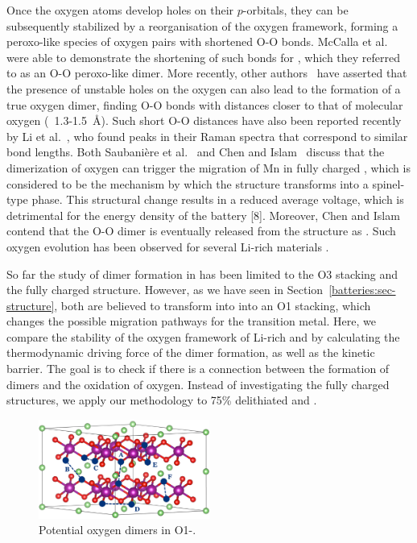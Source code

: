 \begin{refsection}
Once the oxygen atoms develop holes on their $p$-orbitals, they can be subsequently stabilized by a reorganisation of the oxygen framework, forming a peroxo-like species of oxygen pairs with shortened O-O bonds. McCalla et al.~\cite{McCalla2015} were able to demonstrate the shortening of such bonds for , which they referred to as an O-O peroxo-like dimer. More recently, other authors~\cite{Saubanere2016, Chen2016} have asserted that the presence of unstable holes on the oxygen can also lead to the formation of a true oxygen dimer, finding O-O bonds with distances closer to that of molecular oxygen (~1.3-1.5~\si{\angstrom}). Such short O-O distances have also been reported recently by Li et al.~\cite{Li2018}, who found peaks in their Raman spectra that correspond to similar bond lengths. Both Saubani\`ere et al.~\cite{Saubanere2016} and Chen and Islam~\cite{Chen2016} discuss that the dimerization of oxygen can trigger the migration of Mn in fully charged , which is considered to be the mechanism by which the structure transforms into a spinel-type phase. This structural change results in a reduced average voltage, which is detrimental for the energy density of the battery [8]. Moreover, Chen and Islam contend that the O-O dimer is eventually released from the structure as . Such oxygen evolution has been observed for several Li-rich materials \cite{Armstrong2006, Luo2016}. 

So far the study of dimer formation in  has been limited to the O3 stacking and the fully charged structure. However, as we have seen in Section~\ref{batteries:sec-structure}, both   are believed to transform into into an O1 stacking, which changes the possible migration pathways for the transition metal. Here, we compare the stability of the oxygen framework of Li-rich  and  by calculating the thermodynamic driving force of the dimer formation, as well as the kinetic barrier. The goal is to check if there is a connection between the formation of dimers and the oxidation of oxygen. Instead of investigating the fully charged structures, we apply our methodology to 75\% delithiated  and . 

\begin{figure}
\centering
\includegraphics[width=0.5\textwidth]{Figures/batteries/oxygen_dimers.png}
\caption{Potential oxygen dimers in O1-.}
\label{batteries:fig-oxygen_dimers} 
\end{figure}


\end{refsection}
